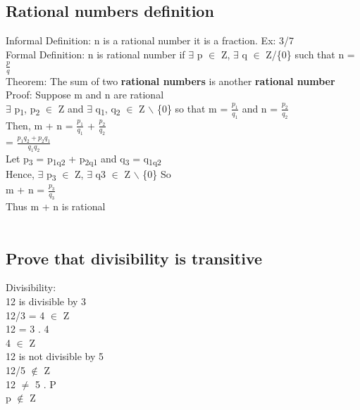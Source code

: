 \documentclass[11pt]{article}
\begin{document}
\subsection{Rational numbers definition}
\label{sec:org903fb68}
Informal Definition: n is a rational number it is a fraction. Ex: 3/7\\
Formal Definition: n is rational number if \(\exists\) p \(\in\) Z, \(\exists\) q \(\in\) Z/\{0\} such that n = \(\frac{p}{q}\)\\

Theorem: The sum of two \textbf{rational numbers} is another \textbf{rational number}\\
Proof: Suppose m and n are rational\\
\(\exists\) p\textsubscript{1}, p\textsubscript{2} \(\in\) Z and \(\exists\) q\textsubscript{1}, q\textsubscript{2} \(\in\) Z $\backslash$ \{0\} so that m = \(\frac{p_1}{q_1}\) and n = \(\frac{p_2}{q_2}\)\\
Then, m + n = \(\frac{p_1}{q_1}\) + \(\frac{p_2}{q_2}\)\\
= \(\frac{p_1q_2+p_2q_1}{q_1q_2}\)\\
Let p\textsubscript{3} = p\textsubscript{1q}\textsubscript{2} + p\textsubscript{2q}\textsubscript{1} and q\textsubscript{3} = q\textsubscript{1q}\textsubscript{2}\\
Hence, \(\exists\) p\textsubscript{3} \(\in\) Z, \(\exists\) q3 \(\in\) Z $\backslash$ \{0\} So\\
m + n = \(\frac{p_3}{q_3}\)\\
Thus m + n is rational\\
\square\\

\subsection{Prove that divisibility is transitive}
\label{sec:org9c9a640}
Divisibility:\\
12 is divisible by 3\\
12/3 = 4 \(\in\) Z\\
12 = 3 . 4\\
4 \(\in\) Z\\

12 is not divisible by 5\\
12/5 \(\notin\) Z\\

12 \(\neq\) 5 . P\\
p \(\notin\) Z\\
\end{document}
